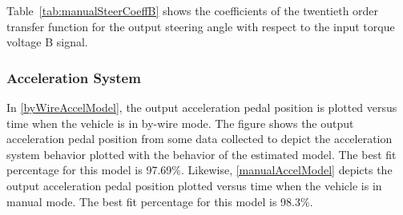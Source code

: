 \documentclass[journal,twoside,web]{ieeecolor}
\begin{document}
\noindent Table~\ref{tab:manualSteerCoeffB} shows the coefficients of
the twentieth order transfer function for the output steering angle with respect
to the input torque voltage B signal. %
%
\begin{table}[hbtp]
	\caption{Manual Mode Steering Transfer Function Torque Voltage B Coefficient Table}
	\label{tab:manualSteerCoeffB}
  \centering
	\begin{center}
	\end{center}	
\end{table}
%

\subsubsection{Acceleration System}
In \autoref{byWireAccelModel}, the output acceleration pedal position is plotted versus time when the vehicle is in by-wire mode. The figure shows the output acceleration pedal position from some data collected to depict the acceleration system behavior plotted with the behavior of the estimated model. The best fit percentage for this model is 97.69\%. Likewise, \autoref{manualAccelModel} depicts the output acceleration pedal position plotted versus time when the vehicle is in manual mode. The best fit percentage for this model is 98.3\%. 
\end{document}
